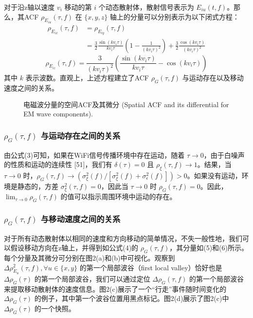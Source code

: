 \documentclass[journal]{IEEEtran}
\begin{document}
对于沿z轴以速度 $v_i$ 移动的第 $i$ 个动态散射体，散射信号表示为 $E_{iu}(t,f)$。那么，其ACF $\rho_{E_{iu}}(\tau,f)$ 在 $\{x,y,z\}$ 轴上的分量可以分别表示为以下闭式方程：
\begin{equation}
\begin{aligned}
\rho_{E_{ix}}(\tau,f) &= \rho_{E_{iy}}(\tau,f) \\
&= \frac{3}{2}\frac{\sin(kv_{i}\tau)}{kv_{i}\tau}\left(1-\frac{1}{(kv_{i}\tau)^{2}}\right) + \frac{3}{2}\frac{\cos(kv_{i}\tau)}{(kv_{i}\tau)^{2}}
\end{aligned}
\end{equation}
\begin{equation}
\rho_{E_{iz}}(\tau,f) = \frac{3}{(kv_{i}\tau)^{2}}\left(\frac{\sin(kv_{i}\tau)}{kv_{i}\tau}-\cos(kv_{i}\tau)\right)
\end{equation}
其中 $k$ 表示波数。直观上，上述方程建立了ACF $\rho_{G}(\tau,f)$ 与运动存在以及移动速度之间的关系。

\begin{figure}[htbp]
\centering
\vspace{4cm} %
\caption{电磁波分量的空间ACF及其微分 (Spatial ACF and its differential for EM wave components).}
\end{figure}

\subsubsection{$\rho_{G}(\tau,f)$ 与运动存在之间的关系}
由公式(3)可知，如果在WiFi信号传播环境中存在运动，随着 $\tau \rightarrow 0$，由于白噪声的性质和运动的连续性 [51]，我们有 $\delta(\tau)=0$ 且 $\rho_{\xi}(\tau,f) \rightarrow 1$。结果，当 $\tau \rightarrow 0$ 时，$\rho_{G}(\tau,f) \rightarrow \left(\sigma_{\xi}^{2}(f) / [\sigma_{\xi}^{2}(f)+\sigma_{\epsilon}^{2}(f)]\right) > 0$。如果没有运动，环境是静态的，方差 $\sigma_{\xi}^{2}(\tau,f)=0$，因此当 $\tau \rightarrow 0$ 时 $\rho_{G}(\tau,f)=0$。因此，$\lim_{\tau \rightarrow 0}\rho_{G}(\tau,f)$ 的值可以指示周围环境中运动的存在。

\subsubsection{$\rho_{G}(\tau,f)$ 与移动速度之间的关系}
对于所有动态散射体以相同的速度和方向移动的简单情况，不失一般性地，我们可以假设移动方向在z轴上，并得到如公式(4)的 $\rho_{G}(\tau,f)$，其分量如(5)和(6)所示。每个分量及其微分可分别在图2(a)和(b)中可视化。观察到 $\Delta\rho_{E_u}^{2}(\tau,f), \forall u \in \{x,y\}$ 的第一个局部波谷（first local valley）恰好也是 $\Delta\rho_{G}(\tau)$ 的第一个局部波谷，我们可以通过定位 $\Delta\rho_{G}(\tau,f)$ 的第一个局部波谷来提取移动散射体的速度信息。图2(c)展示了一个“行走”事件随时间变化的 $\Delta\rho_{G}(\tau)$ 的例子，其中第一个波谷位置用黑点标记。图2(d)展示了图2(c)中 $\Delta\rho_{G}(\tau)$ 的一个快照。
\end{document}
